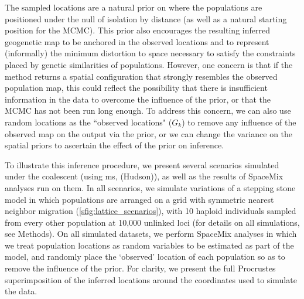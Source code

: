 \documentclass[12pt]{article}
\begin{document}

The sampled locations are a natural prior on where the populations are positioned under the null of isolation by distance (as well as a natural starting position for the MCMC). This prior also encourages the resulting inferred geogenetic map to be anchored in the observed locations and to represent (informally) the minimum distortion to space necessary to satisfy the constraints placed by genetic similarities of populations. However, one concern is that if the method returns a spatial configuration that strongly resembles the observed population map, this could reflect the possibility that there is insufficient information in the data to overcome the influence of the prior, or that the MCMC has not been run long enough.  To address this concern, we can also use random locations as the ``observed locations" ($G_k$) to remove any influence of the observed map on the output via the prior, or we can change the variance on the spatial priors to ascertain the effect of the prior on inference. 

To illustrate this inference procedure, we present several scenarios simulated under the coalescent (using \textrm{ms}, (Hudson)), as well as the results of SpaceMix analyses run on them.  In all scenarios, we simulate variations of a stepping stone model in which populations are arranged on a grid with symmetric nearest neighbor migration (\ref{sfig:lattice_scenarios}), with 10 haploid individuals sampled from every other population at 10,000 unlinked loci (for details on all simulations, see Methods). On all simulated datasets, we perform SpaceMix analyses in which we treat population locations as random variables to be estimated as part of the model, and randomly place the `observed' location of each population so as to remove the influence of the prior.  For clarity, we present the full Procrustes superimposition of the inferred locations around the coordinates used to simulate the data.
\end{document}
